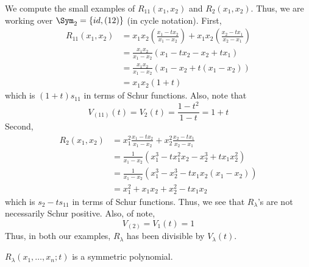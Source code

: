 \documentclass[11pt,leqno,oneside]{amsart}
\numberwithin{thm}{section}
\begin{document}
\begin{example}
  We compute the small examples of \(R_{11}(x_1,x_2)\) and
  \(R_{2}(x_1, x_2)\). Thus, we are working over \(\Sym_2 = \{id,
  (12)\}\) (in cycle notation). First,
  \begin{align*}
    R_{11}(x_1, x_2) 
    & = x_1 x_2 \left( \frac{x_1-tx_2}{x_1-x_2} \right) + x_1 x_2
      \left( \frac{x_2-tx_1}{x_2-x_1} \right)\\
    & = \frac{x_1 x_2}{x_1-x_2} (x_1-tx_2-x_2+tx_1)\\
    & = \frac{x_1 x_2}{x_1 - x_2}(x_1-x_2+t(x_1-x_2))\\
    & = x_1 x_2 (1+t) 
  \end{align*}
  which is \((1+t)s_{11}\) in terms of Schur functions. Also, note
  that \[
    V_{(11)}(t) = V_2(t) = \frac{1-t^2}{1-t} = 1+t
  \]
  Second,
  \begin{align*}
    R_2(x_1, x_2)
    & = x_1^2 \frac{x_1-tx_2}{x_1-x_2} + x_2^2
      \frac{x_2-tx_1}{x_2-x_1} \\
    & = \frac{1}{x_1-x_2}(x_1^3-tx_1^2 x_2 - x_2^3 + tx_1x_2^2)\\
    & = \frac{1}{x_1-x_2}(x_1^3-x_2^3-tx_1x_2(x_1-x_2))\\
    & = x_1^2+x_1x_2+x_2^2-tx_1x_2
  \end{align*}
  which is \(s_2-ts_{11}\) in terms of Schur functions. Thus, we see
  that \(R_\lambda\)'s are not necessarily Schur positive. Also, of
  note, \[
    V_{(2)} = V_1(t) = 1
  \]
  Thus, in both our examples, \(R_\lambda\) has been divisible by
  \(V_\lambda(t)\). 
\end{example}
\begin{prop}
  \(R_\lambda(x_1, \ldots, x_n;t)\) is a symmetric polynomial.
\end{prop}
\end{document}
